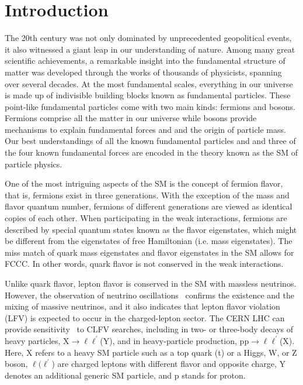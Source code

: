 \chapter{Introduction}
\label{chap:Introduction}

The 20th century was not only dominated by unprecedented geopolitical events, it also witnessed a giant leap in our understanding of nature. Among many great scientific achievements, a remarkable insight into the fundamental structure of matter was developed through the works of thousands of physicists, spanning over several decades. At the most fundamental scales, everything in our universe is made up of indivisible building blocks known as fundamental particles. These point-like fundamental particles come with two main kinds: fermions and bosons. Fermions comprise all the matter in our universe while bosons provide mechanisms to explain fundamental forces and and the origin of particle mass. Our best understandings of all the known fundamental particles and and three of the four known fundamental forces are encoded in the theory known as the \ac{SM} of particle physics.

One of the most intriguing aspects of the \ac{SM} is the concept of fermion flavor, that is, fermions exist in three generations. With the exception of the mass and flavor quantum number, fermions of different generations are viewed as identical copies of each other. When participating in the weak interactions, fermions are described by special quantum states known as the flavor eigenstates, which might be different from the eigenstates of free Hamiltonian (i.e. mass eigenstates). The miss match of quark mass eigenstates and flavor eigenstates in the \ac{SM} allows for \ac{FCCC}. In other words, quark flavor is not conserved in the weak interactions.

Unlike quark flavor, lepton flavor is conserved in the \ac{SM} with massless neutrinos. However, the observation of neutrino oscillations~\cite{Super-Kamiokande:1998kpq,SNO:2002tuh} confirms the existence and the mixing of massive neutrinos, and it also indicates that lepton flavor violation (LFV) is expected to occur in the charged-lepton sector. The \ac{CERN} \ac{LHC} can provide sensitivity~\cite{Davidson:2012wn} to \ac{CLFV} searches, including in two- or three-body decays of heavy particles, X$\rightarrow\ell\ell^{\prime}$(Y), and in heavy-particle production, pp$ \rightarrow\ell\ell^{\prime}$(X). Here, X refers to a heavy \ac{SM} particle such as a top quark (t) or a Higgs, W, or Z boson, $\ell(\ell^{\prime}$) are charged leptons with different flavor and opposite charge, Y denotes an additional generic \ac{SM} particle, and p stands for proton. 

